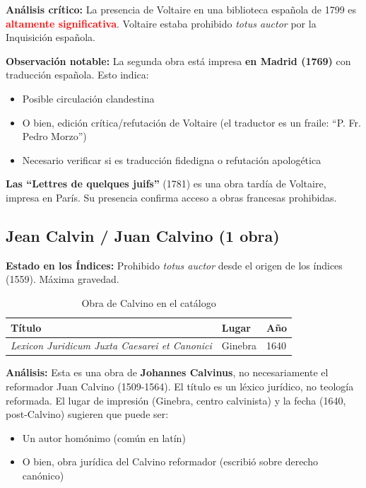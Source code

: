 \documentclass[12pt,a4paper]{article}
\begin{document}
\textbf{Análisis crítico:} La presencia de Voltaire en una biblioteca española de 1799 es \textcolor{red}{\textbf{altamente significativa}}. Voltaire estaba prohibido \textit{totus auctor} por la Inquisición española.

\textbf{Observación notable:} La segunda obra está impresa \textbf{en Madrid (1769)} con traducción española. Esto indica:

\begin{itemize}
    \item Posible circulación clandestina
    \item O bien, edición crítica/refutación de Voltaire (el traductor es un fraile: ``P. Fr. Pedro Morzo'')
    \item Necesario verificar si es traducción fidedigna o refutación apologética
\end{itemize}

\textbf{Las ``Lettres de quelques juifs''} (1781) es una obra tardía de Voltaire, impresa en París. Su presencia confirma acceso a obras francesas prohibidas.

\subsection{Jean Calvin / Juan Calvino (1 obra)}

\textbf{Estado en los Índices:} Prohibido \textit{totus auctor} desde el origen de los índices (1559). Máxima gravedad.

\begin{table}[h]
\centering
\caption{Obra de Calvino en el catálogo}
\begin{tabular}{p{8cm}p{2.5cm}p{2cm}}
\toprule
\textbf{Título} & \textbf{Lugar} & \textbf{Año} \\
\midrule
\textit{Lexicon Juridicum Juxta Caesarei et Canonici} & Ginebra & 1640 \\
\bottomrule
\end{tabular}
\end{table}

\textbf{Análisis:} Esta es una obra de \textbf{Johannes Calvinus}, no necesariamente el reformador Juan Calvino (1509-1564). El título es un léxico jurídico, no teología reformada. El lugar de impresión (Ginebra, centro calvinista) y la fecha (1640, post-Calvino) sugieren que puede ser:

\begin{itemize}
    \item Un autor homónimo (común en latín)
    \item O bien, obra jurídica del Calvino reformador (escribió sobre derecho canónico)
\end{itemize}
\end{document}
